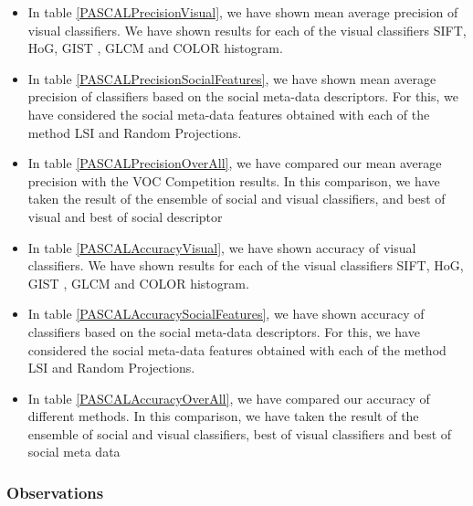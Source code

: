 \begin{itemize}
\item In table \ref{PASCALPrecisionVisual}, we have shown mean average precision of visual classifiers. We have shown results for each of the visual classifiers SIFT, HoG, GIST , GLCM and COLOR histogram.
\item In table \ref{PASCALPrecisionSocialFeatures}, we have shown mean average precision of classifiers based on the social meta-data descriptors. For this, we have considered the social meta-data features obtained with each of the method LSI and Random Projections.
\item In table \ref{PASCALPrecisionOverAll}, we have compared our mean average precision with the  VOC Competition results. In this comparison, we have taken the result of the ensemble of social and visual classifiers, and best of visual and best of social descriptor
\item In table \ref{PASCALAccuracyVisual},  we have shown accuracy of visual classifiers. We have shown results for each of the visual classifiers SIFT, HoG, GIST , GLCM and COLOR histogram.
\item In table \ref{PASCALAccuracySocialFeatures}, we have shown accuracy  of classifiers based on the social meta-data descriptors. For this, we have considered the social meta-data features obtained with each of the method LSI and Random Projections.
\item In table \ref{PASCALAccuracyOverAll}, we have compared our accuracy of different methods. In this comparison, we have taken the result of the ensemble of social and visual classifiers,  best of visual classifiers and best of social meta data
\end{itemize}

\subsubsection*{Observations}

